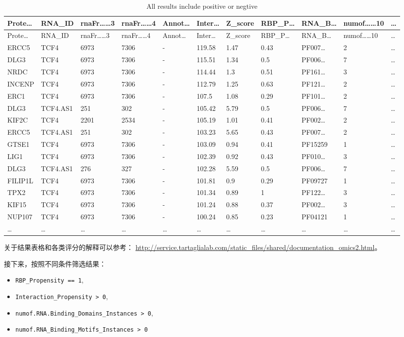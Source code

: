 \documentclass[
]{article}
\providecommand{\tightlist}{%
  \setlength{\itemsep}{0pt}\setlength{\parskip}{0pt}}
\begin{document}
\begin{longtable}[]{@{}lllllllllll@{}}
\caption{\label{tab:all-results-include-positive-or-negtive}All results include positive or negtive}\tabularnewline
\toprule
Prote\ldots{} & RNA\_ID & rnaFr\ldots\ldots3 & rnaFr\ldots\ldots4 & Annot\ldots{} & Inter\ldots{} & Z\_score & RBP\_P\ldots{} & RNA\_B\ldots{} & numof\ldots\ldots10 & \ldots{}\tabularnewline
\midrule
\endfirsthead
\toprule
Prote\ldots{} & RNA\_ID & rnaFr\ldots\ldots3 & rnaFr\ldots\ldots4 & Annot\ldots{} & Inter\ldots{} & Z\_score & RBP\_P\ldots{} & RNA\_B\ldots{} & numof\ldots\ldots10 & \ldots{}\tabularnewline
\midrule
\endhead
ERCC5 & TCF4 & 6973 & 7306 & - & 119.58 & 1.47 & 0.43 & PF007\ldots{} & 2 & \ldots{}\tabularnewline
DLG3 & TCF4 & 6973 & 7306 & - & 115.51 & 1.34 & 0.5 & PF006\ldots{} & 7 & \ldots{}\tabularnewline
NRDC & TCF4 & 6973 & 7306 & - & 114.44 & 1.3 & 0.51 & PF161\ldots{} & 3 & \ldots{}\tabularnewline
INCENP & TCF4 & 6973 & 7306 & - & 112.79 & 1.25 & 0.63 & PF121\ldots{} & 2 & \ldots{}\tabularnewline
ERC1 & TCF4 & 6973 & 7306 & - & 107.5 & 1.08 & 0.29 & PF101\ldots{} & 2 & \ldots{}\tabularnewline
DLG3 & TCF4.AS1 & 251 & 302 & - & 105.42 & 5.79 & 0.5 & PF006\ldots{} & 7 & \ldots{}\tabularnewline
KIF2C & TCF4 & 2201 & 2534 & - & 105.19 & 1.01 & 0.41 & PF002\ldots{} & 2 & \ldots{}\tabularnewline
ERCC5 & TCF4.AS1 & 251 & 302 & - & 103.23 & 5.65 & 0.43 & PF007\ldots{} & 2 & \ldots{}\tabularnewline
GTSE1 & TCF4 & 6973 & 7306 & - & 103.09 & 0.94 & 0.41 & PF15259 & 1 & \ldots{}\tabularnewline
LIG1 & TCF4 & 6973 & 7306 & - & 102.39 & 0.92 & 0.43 & PF010\ldots{} & 3 & \ldots{}\tabularnewline
DLG3 & TCF4.AS1 & 276 & 327 & - & 102.28 & 5.59 & 0.5 & PF006\ldots{} & 7 & \ldots{}\tabularnewline
FILIP1L & TCF4 & 6973 & 7306 & - & 101.81 & 0.9 & 0.29 & PF09727 & 1 & \ldots{}\tabularnewline
TPX2 & TCF4 & 6973 & 7306 & - & 101.34 & 0.89 & 1 & PF122\ldots{} & 3 & \ldots{}\tabularnewline
KIF15 & TCF4 & 6973 & 7306 & - & 101.24 & 0.88 & 0.37 & PF002\ldots{} & 3 & \ldots{}\tabularnewline
NUP107 & TCF4 & 6973 & 7306 & - & 100.24 & 0.85 & 0.23 & PF04121 & 1 & \ldots{}\tabularnewline
\ldots{} & \ldots{} & \ldots{} & \ldots{} & \ldots{} & \ldots{} & \ldots{} & \ldots{} & \ldots{} & \ldots{} & \ldots{}\tabularnewline
\bottomrule
\end{longtable}

关于结果表格和各类评分的解释可以参考： \url{http://service.tartaglialab.com/static_files/shared/documentation_omics2.html}。

接下来，按照不同条件筛选结果：

\begin{itemize}
\tightlist
\item
  \texttt{RBP\_Propensity\ ==\ 1},
\item
  \texttt{Interaction\_Propensity\ \textgreater{}\ 0},
\item
  \texttt{numof.RNA.Binding\_Domains\_Instances\ \textgreater{}\ 0},
\item
  \texttt{numof.RNA\_Binding\_Motifs\_Instances\ \textgreater{}\ 0}
\end{itemize}
\end{document}
